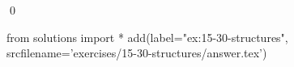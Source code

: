
\begin{ex}
  \label{ex:15-30-structures}
  
  \qed
\end{ex}
\begin{python0}
from solutions import *
add(label="ex:15-30-structures",
    srcfilename='exercises/15-30-structures/answer.tex')
\end{python0}
